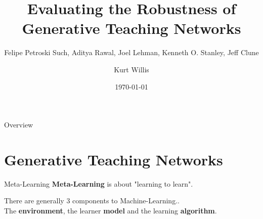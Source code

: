 \documentclass[10pt,usenames,dvipsnames]{beamer}
\title{
Evaluating the Robustness of \\
Generative Teaching Networks
}
\subtitle{Felipe Petroski Such, Aditya Rawal, Joel Lehman, Kenneth O. Stanley, Jeff Clune}
\date{\today}
\author{Kurt Willis}
\institute{TU Berlin}
\begin{document}
\maketitle

\begin{frame}{Overview}
\large
\tableofcontents
\end{frame}


\section{Generative Teaching Networks}

\begin{frame}{Meta-Learning}
    \textbf{Meta-Learning} is about "learning to learn". 
    
    There are generally 3 components to Machine-Learning.. \\
    The \textbf{environment}, the learner \textbf{model} and the learning \textbf{algorithm}.
    
\end{frame}
\end{document}
